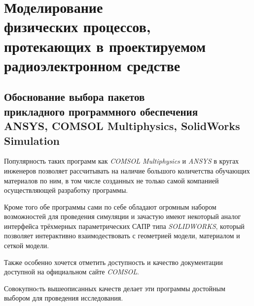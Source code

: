 \section{Моделирование \\
  физических процессов, \\
  протекающих в проектируемом\\
  радиоэлектронном средстве}

  
  


\subsection{Обоснование выбора пакетов \\
  прикладного программного обеспечения \\
  ANSYS, COMSOL Multiphysics, SolidWorks Simulation}

Популярность таких программ как \textit{COMSOL Multiphysics} и
\textit{ANSYS} в кругах инженеров позволяет рассчитывать на наличие
большого количетства обучающих материалов по ним, в том числе
созданных не только самой компанией осуществляющей разработку
программы.

Кроме того обе программы сами по себе обладают огромным набором
возможностей для проведения симуляции и зачастую имеют некоторый
аналог интерфейса трёхмерных параметрических САПР типа
\textit{SOLIDWORKS}, который позволяет интерактивно взаимодествовать с
геометрией модели, материалом и сеткой модели.

Также особенно хочется отметить доступность и качество документации
доступной на официальном сайте \textit{COMSOL}.

Совокупноcть вышеописанных качеств делает эти программы достойным
выбором для проведения исследования.

\newpage

